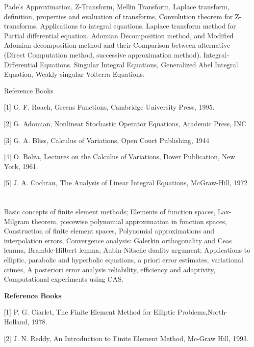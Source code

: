 Pade's Approximation, Z-Transform, Mellin Transform, Laplace transform, definition, properties and evaluation of transforms, Convolution theorem for Z-transforms, Applications to integral equations. Laplace transform method for Partial differential equation. Adomian Decomposition method, and Modified Adomian decomposition method and their Comparison between alternative (Direct Computation method, successive approximation method). Integral-Differential Equations. Singular Integral Equations, Generalized Abel Integral Equation, Weakly-singular Volterra Equations.

Reference Books

[1] G. F. Roach, Greens Functions, Cambridge University Press, 1995.

[2] G. Adomian, Nonlinear Stochastic Operator Equations, Academic Press, INC

[3] G. A. Bliss, Calculus of Variations, Open Court Publishing, 1944

[4] O. Bolza, Lectures on the Calculus of Variations, Dover Publication, New York, 1961.

[5] J. A. Cochran, The Analysis of Linear Integral Equations, McGraw-Hill, 1972



\section{\dsccourseinfo}


 

Basic concepts of finite element methods; Elements of function spaces, Lax-Milgram theorem, piecewise polynomial approximation in function spaces, Construction of finite element spaces, Polynomial approximations and interpolation errors, Convergence analysis: Galerkin orthogonality and Ceas lemma, Bramble-Hilbert lemma, Aubin-Nitsche duality argument; Applications to elliptic, parabolic and hyperbolic equations, a priori error estimates, variational crimes, A posteriori error analysis reliability, efficiency and adaptivity, Computational experiments using CAS. 

 

 \textbf{Reference Books} 

[1] P. G. Ciarlet, The Finite Element Method for Elliptic Problems,North-Holland, 1978. 

[2] J. N. Reddy, An Introduction to Finite Element Method, Mc-Graw Hill, 1993. 

